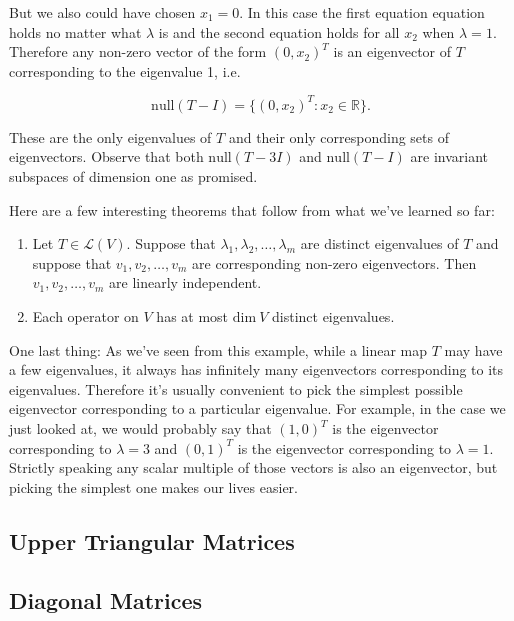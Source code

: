 \documentclass[12pt]{article}
\begin{document}
But we also could have chosen $x_1 = 0$. In this case the first equation equation holds no matter what $\lambda$ is and the second equation holds for all $x_2$ when $\lambda = 1$. Therefore any non-zero vector of the form $(0, x_2)^T$ is an eigenvector of $T$ corresponding to the eigenvalue 1, i.e.

$$\textrm{null} (T - I) = \{ (0, x_2)^T : x_2 \in \mathbb{R} \}.$$

These are the only eigenvalues of $T$ and their only corresponding sets of eigenvectors. Observe that both $\textrm{null} (T - 3I)$ and $\textrm{null} (T - I)$ are invariant subspaces of dimension one as promised.

Here are a few interesting theorems that follow from what we've learned so far:

\begin{enumerate}
\item Let $T \in \mathcal{L} (V)$. Suppose that $\lambda_1, \lambda_2, \ldots, \lambda_m$ are distinct eigenvalues of $T$ and suppose that $v_1, v_2, \ldots, v_m$ are corresponding non-zero eigenvectors. Then $v_1, v_2, \ldots, v_m$ are linearly independent.

\item Each operator on $V$ has at most $\textrm{dim} \: V$ distinct eigenvalues.

\end{enumerate}

\vskip 3mm
One last thing: As we've seen from this example, while a linear map $T$ may have a few eigenvalues, it always has infinitely many eigenvectors corresponding to its eigenvalues. Therefore it's usually convenient to pick the simplest possible eigenvector corresponding to a particular eigenvalue. For example, in the case we just looked at, we would probably say that $(1, 0)^T$ is the eigenvector corresponding to $\lambda = 3$ and $(0, 1)^T$ is the eigenvector corresponding to $\lambda = 1$. Strictly speaking any scalar multiple of those vectors is also an eigenvector, but picking the simplest one makes our lives easier. 

\subsection*{Upper Triangular Matrices}

\subsection*{Diagonal Matrices}
\end{document}
